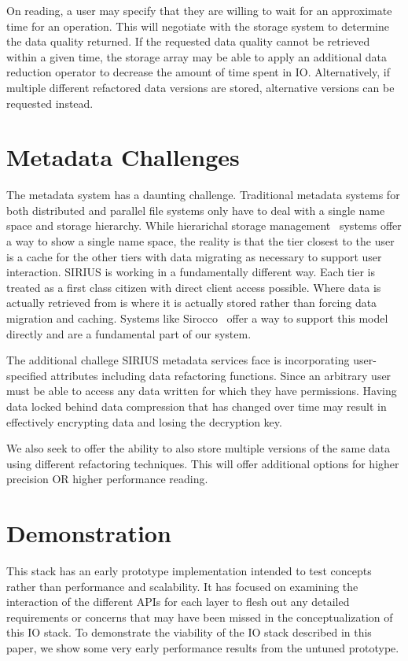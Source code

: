 \documentclass{sig-alt-gov2}
\begin{document}
On reading, a user may specify that they are willing to wait for an approximate
time for an operation. This will negotiate with the storage system to determine
the data quality returned. If the requested data quality cannot be retrieved
within a given time, the storage array may be able to apply an additional
data reduction operator to decrease the amount of time spent in IO.
Alternatively, if multiple different refactored data versions are stored,
alternative versions can be requested instead.

\section{Metadata Challenges}
\label{sec:metadata}

The metadata system has a daunting challenge. Traditional metadata systems for
both distributed and parallel file systems only have to deal with a single name
space and storage hierarchy. While hierarichal storage management~\cite{hsm}
systems offer a way to show a single name space, the reality is that the tier
closest to the user is a cache for the other tiers with data migrating as
necessary to support user interaction. SIRIUS is working in a fundamentally
different way. Each tier is treated as a first class citizen with direct
client access possible. Where data is actually retrieved from is where it is
actually stored rather than forcing data migration and caching. Systems like
Sirocco~\cite{sirocco} offer a way to support this model directly and are a
fundamental part of our system.

The additional challege SIRIUS metadata services face is incorporating
user-specified attributes including data refactoring functions. Since an
arbitrary user must be able to access any data written for which they have
permissions. Having data locked behind data compression that has changed over
time may result in effectively encrypting data and losing the decryption key.

We also seek to offer the ability to also store multiple versions of the same
data using different refactoring techniques. This will offer additional options
for higher precision OR higher performance reading.

\section{Demonstration}
\label{sec:evaluation}

This stack has an early prototype implementation intended to test concepts
rather than performance and scalability. It has focused on examining the
interaction of the different APIs for each layer to flesh out any detailed
requirements or concerns that may have been missed in the conceptualization of
this IO stack. To demonstrate the viability of the IO stack described in this
paper, we show some very early performance results from the untuned prototype.
\end{document}
